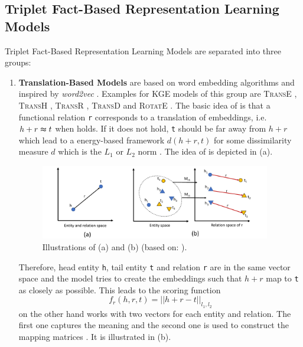 \subsection{Triplet Fact-Based Representation Learning Models} 
\label{subsec:triplet_fact_based_representation_learning_models}

Triplet Fact-Based Representation Learning Models are separated into three groups:
\begin{enumerate}
    \item 
    \textbf{Translation-Based Models} are based on word embedding algorithms and inspired by \textit{word2vec} \cite{electronics9050750}.
    Examples for \ac{KGE} models of this group are \textsc{TransE} \cite{TransE}, \textsc{TransH} \cite{TransH}, \textsc{TransR} \cite{TransR}, \textsc{TransD} \cite{TransD}
    and 
    \textsc{RotatE} \cite{RotatE}.
    The basic idea of \transe is that a functional relation \texttt{r} corresponds to a translation of embeddings, i.e. $h + r \thickapprox t$ when  holds.
    If it does not hold, \texttt{t} should be far away from $h + r$ which lead to a energy-based framework $d(h+r, t)$ for some dissimilarity measure $d$ which is the $L_1$ or $L_2$ norm \cite{TransE}.
    The idea of \transe is depicted in  (a).
    \begin{figure}[H]
      \centering
        \includegraphics[width=0.95\textwidth]{figures/Transe+TransD.pdf}
      \caption{Illustrations of (a) \transe and (b) \transd (based on: \cite{electronics9050750}).}
      \label{fig:translationbasedmodels}
    \end{figure}
    Therefore, head entity \texttt{h}, tail entity \texttt{t} and relation \texttt{r} are in the same vector space and the model tries to create the embeddings such that $h+r$ map to \texttt{t} as closely as possible.
    This leads to the scoring function
    \begin{equation}
        f_r(h,r,t) = || h + r - t ||_{l_1, l_2}
        \label{eq:transescoringfunction}
    \end{equation}
    \transd on the other hand works with two vectors for each entity and relation.
    The first one captures the meaning and the second one is used to construct the mapping matrices \cite{TransD}.
    It is illustrated in  (b).
    

\end{enumerate}
